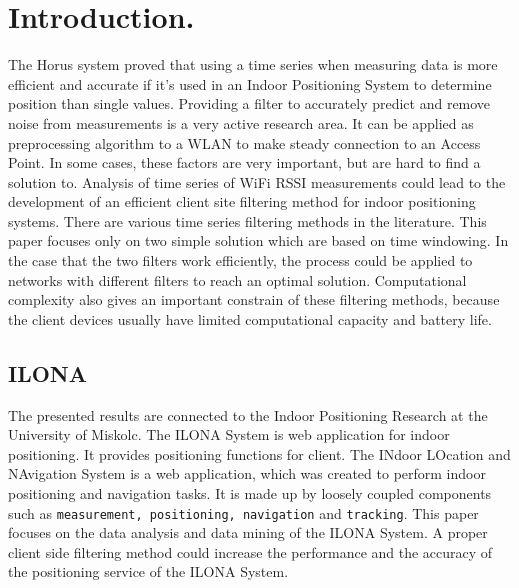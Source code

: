 \chapter{Introduction.}
\label{chap:introduction}


The Horus system proved that using a time series when measuring data is more efficient and accurate if it's used in an Indoor Positioning System to determine position than single values.
Providing a filter to accurately predict and remove noise from measurements is a very active research area.
It can be applied as preprocessing algorithm to a WLAN to make steady connection to an Access Point.
In some cases, these factors are very important, but are hard to find a solution to. 
Analysis of time series of WiFi RSSI measurements could lead to the development of an efficient client site filtering method for indoor positioning systems.
There are various time series filtering methods in the literature. This paper focuses only on two simple solution which are based on time windowing.
In the case that the two filters work efficiently, the process could be applied to networks with different filters to reach an optimal solution.
Computational complexity also gives an important constrain of these filtering methods, because the client devices usually have limited computational capacity and battery life.

\section{ILONA}
The presented results are connected to the Indoor Positioning Research at the University of Miskolc. The ILONA System is web application for indoor positioning. It provides positioning functions for client. 
The INdoor LOcation and NAvigation System is a web application, which was
created to perform indoor positioning and navigation tasks.
It is made up by loosely coupled components such as \texttt{measurement, positioning, navigation} and \texttt{tracking}.
This paper focuses on the data analysis and data mining of the ILONA System.
A proper client side filtering method could increase the performance and the accuracy of the positioning service of the ILONA System.

